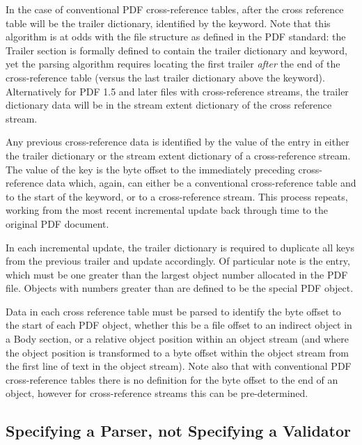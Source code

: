 In the case of conventional PDF
cross-reference tables, after the cross reference table will be the
trailer dictionary, identified by the  keyword. 
Note that this algorithm is at
odds with the file structure as defined in the PDF standard: the Trailer section is formally defined
to contain the trailer dictionary and  keyword, yet the parsing algorithm
requires locating the first trailer \emph{after} the end of the cross-reference table 
(versus the last trailer dictionary above the  keyword). 
Alternatively for PDF 1.5 and later files with cross-reference
streams, the trailer dictionary data will be in the stream extent
dictionary of the cross reference stream. 

Any previous cross-reference data is identified by the value of the  entry in either
the trailer dictionary or the stream extent dictionary of a cross-reference stream. The
value of the  key is the byte offset to the immediately
preceding cross-reference data which, again, can either be a conventional
cross-reference table and to the start of the  keyword, or to a
cross-reference stream. This process repeats, working from the most recent incremental
update back through time to the original PDF document.

In each incremental update, the trailer dictionary is required to duplicate all keys from the previous
trailer and update accordingly. Of particular note is the  entry, which must be
one greater than the largest object number allocated in the PDF file. Objects with numbers greater
than  are defined to be the special PDF  object.

Data in each cross reference table must be parsed to
identify the byte offset to the start of each PDF object, whether this be a file offset to an 
indirect object in a Body section, or a relative object position within an object stream (and 
where the object position is transformed to a byte offset within the object stream from the 
first line of text in the object stream). Note also that with conventional PDF cross-reference 
tables there is no definition for the byte offset to the end of an object, however for cross-reference 
streams this can be pre-determined.


\subsection{Specifying a Parser, not Specifying a Validator}
\label{sec:spec-approach}

